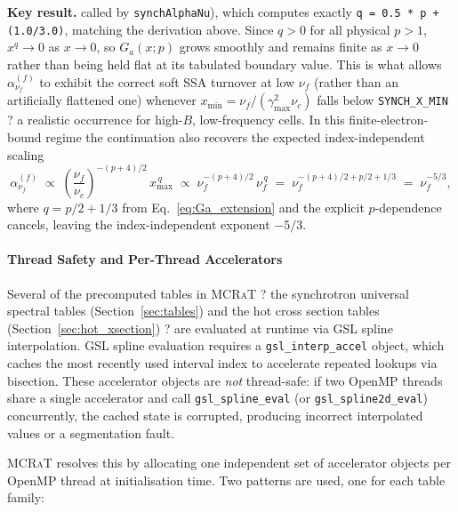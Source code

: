 \documentclass[12pt,a4paper]{article}
\newcommand{\nuf}{\nu_{\!f}}
\newcommand{\nuc}{\nu_c}
\newcommand{\gmax}{\gamma_{\max}}
\newcommand{\code}[1]{\texttt{#1}}
\newcommand{\mcrat}{\textsc{MCRaT}}
\newenvironment{keyresult}{%
	\begin{framed}\noindent\textbf{Key result.}\quad}
	{\end{framed}}
\begin{document}
\begin{keyresult}
	called by \code{synchAlphaNu}), which computes exactly
	\code{q = 0.5 * p + (1.0/3.0)}, matching the derivation above. Since
	$q>0$ for all physical $p>1$, $x^q\to0$ as $x\to0$, so $G_a(x;p)$
	grows smoothly and remains finite as $x\to0$ rather than being held
	flat at its tabulated boundary value. This is what allows
	$\alpha_{\nuf}^{(f)}$ to exhibit the correct soft SSA turnover at low
	$\nuf$ (rather than an artificially flattened one) whenever
	$x_{\min}=\nuf/(\gmax^2\nuc)$ falls below \code{SYNCH\_X\_MIN} ? a
	realistic occurrence for high-$B$, low-frequency cells. In this
	finite-electron-bound regime the continuation also recovers the
	expected index-independent scaling
	\begin{equation}
		\alpha_{\nuf}^{(f)}
		\;\propto\;
		\left(\frac{\nuf}{\nuc}\right)^{-(p+4)/2}
		\,x_{\max}^{\,q}
		\;\propto\;
		\nuf^{-(p+4)/2}\,\nuf^{\,q}
		\;=\;
		\nuf^{-(p+4)/2 + p/2 + 1/3}
		\;=\;
		\nuf^{-5/3},
		\label{eq:alpha_low_frequency}
	\end{equation}
	where $q=p/2+1/3$ from Eq.~\eqref{eq:Ga_extension} and the explicit
	$p$-dependence cancels, leaving the index-independent exponent $-5/3$.
\end{keyresult}

\paragraph{Thread Safety and Per-Thread Accelerators}
\label{sec:thread}

Several of the precomputed tables in \mcrat{} ? the synchrotron universal
spectral tables (Section~\ref{sec:tables}) and the hot cross section tables
(Section~\ref{sec:hot_xsection}) ? are evaluated at runtime via GSL spline
interpolation.  GSL spline evaluation requires a \code{gsl\_interp\_accel}
object, which caches the most recently used interval index to accelerate
repeated lookups via bisection.  These accelerator objects are \emph{not}
thread-safe: if two OpenMP threads share a single accelerator and call
\code{gsl\_spline\_eval} (or \code{gsl\_spline2d\_eval}) concurrently, the
cached state is corrupted, producing incorrect interpolated values or a
segmentation fault.

\mcrat{} resolves this by allocating one independent set of accelerator
objects per OpenMP thread at initialisation time.  Two patterns are used,
one for each table family:
\end{document}
